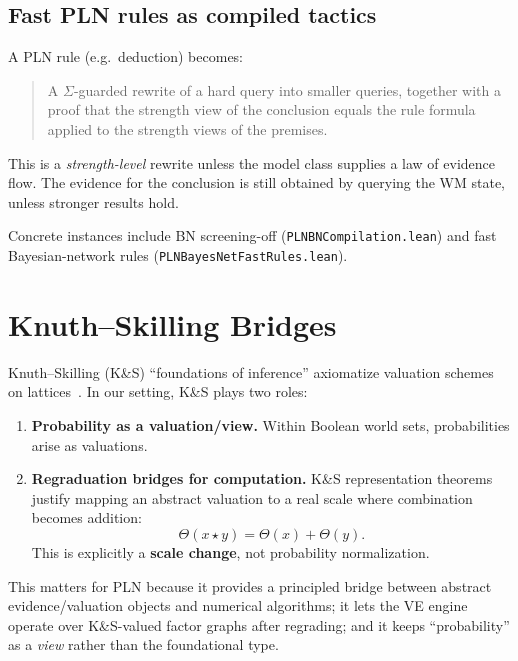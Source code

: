 \documentclass[]{article}
\newcommand{\code}[1]{\texttt{#1}}
\begin{document}
\subsection{Fast PLN rules as compiled tactics}

A PLN rule (e.g.\ deduction) becomes:

\begin{quote}
A $\Sigma$-guarded rewrite of a hard query into smaller queries, together
with a proof that the strength view of the conclusion equals the rule
formula applied to the strength views of the premises.
\end{quote}

This is a \emph{strength-level} rewrite unless the model class supplies a
law of evidence flow. The evidence for the conclusion is still obtained by
querying the WM state, unless stronger results hold.

Concrete instances include BN screening-off
(\code{PLNBNCompilation.lean}) and fast Bayesian-network
rules (\code{PLNBayesNetFastRules.lean}).


\section{Knuth--Skilling Bridges}
\label{sec:ks}

Knuth--Skilling (K\&S) ``foundations of inference'' axiomatize valuation
schemes on lattices~\cite{KnuthSkilling2012}. In our setting, K\&S plays
two roles:

\begin{enumerate}[leftmargin=2em]
\item \textbf{Probability as a valuation/view.}
Within Boolean world sets, probabilities arise as valuations.
\item \textbf{Regraduation bridges for computation.}
K\&S representation theorems justify mapping an abstract valuation to a
real scale where combination becomes addition:
\[
  \Theta(x \star y) = \Theta(x) + \Theta(y).
\]
This is explicitly a \textbf{scale change}, not probability normalization.
\end{enumerate}

This matters for PLN because it provides a principled bridge between
abstract evidence/valuation objects and numerical algorithms; it lets the
VE engine operate over K\&S-valued factor graphs after regrading; and it
keeps ``probability'' as a \emph{view} rather than the foundational type.
\end{document}
